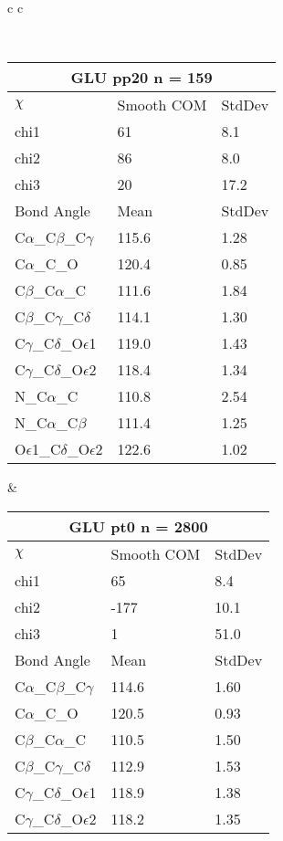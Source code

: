 \begin{longtable}{ c c }

\caption{GLU Central Values}\\
  \begin{tabular}{ l l l }
  \toprule
  \multicolumn{3}{c}{GLU \textbf{pp20} n = 159} \\ \toprule
  $\chi$       & Smooth COM & StdDev \\ \midrule
  chi1 & 61 & 8.1 \\ 
  chi2 & 86 & 8.0 \\ 
  chi3 & 20 & 17.2 \\ \midrule
  Bond Angle   & Mean     & StdDev \\ \midrule
  C$\alpha$\_C$\beta$\_C$\gamma$ & 115.6 & 1.28\\
  C$\alpha$\_C\_O & 120.4 & 0.85\\
  C$\beta$\_C$\alpha$\_C & 111.6 & 1.84\\
  C$\beta$\_C$\gamma$\_C$\delta$ & 114.1 & 1.30\\
  C$\gamma$\_C$\delta$\_O$\epsilon$1 & 119.0 & 1.43\\
  C$\gamma$\_C$\delta$\_O$\epsilon$2 & 118.4 & 1.34\\
  N\_C$\alpha$\_C & 110.8 & 2.54\\
  N\_C$\alpha$\_C$\beta$ & 111.4 & 1.25\\
  O$\epsilon$1\_C$\delta$\_O$\epsilon$2 & 122.6 & 1.02\\
  \bottomrule
  \end{tabular}
  &
  \begin{tabular}{ l l l }
  \toprule
  \multicolumn{3}{c}{GLU \textbf{pt0} n = 2800} \\ \toprule
  $\chi$       & Smooth COM & StdDev \\ \midrule
  chi1 & 65 & 8.4 \\ 
  chi2 & -177 & 10.1 \\ 
  chi3 & 1 & 51.0 \\ \midrule
  Bond Angle   & Mean     & StdDev \\ \midrule
  C$\alpha$\_C$\beta$\_C$\gamma$ & 114.6 & 1.60\\
  C$\alpha$\_C\_O & 120.5 & 0.93\\
  C$\beta$\_C$\alpha$\_C & 110.5 & 1.50\\
  C$\beta$\_C$\gamma$\_C$\delta$ & 112.9 & 1.53\\
  C$\gamma$\_C$\delta$\_O$\epsilon$1 & 118.9 & 1.38\\
  C$\gamma$\_C$\delta$\_O$\epsilon$2 & 118.2 & 1.35\\

\end{tabular}
\end{longtable}
